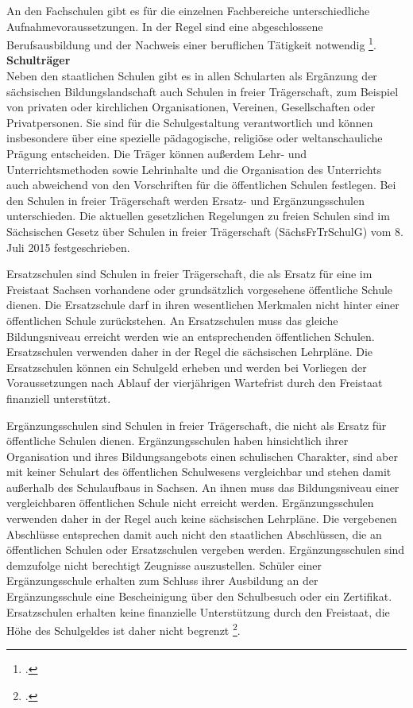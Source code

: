 An den Fachschulen gibt es für die einzelnen Fachbereiche unterschiedliche Aufnahmevoraussetzungen. In der Regel sind eine abgeschlossene Berufsausbildung und der Nachweis einer beruflichen Tätigkeit notwendig \footcite[vgl.][15ff]{SMKSK2013}.\\

\textbf{Schulträger}\\
Neben den staatlichen Schulen gibt es in allen Schularten als Ergänzung der sächsischen Bildungslandschaft auch Schulen in freier Trägerschaft, zum Beispiel von privaten oder kirchlichen Organisationen, Vereinen, Gesellschaften oder Privatpersonen. Sie sind für die Schulgestaltung verantwortlich und können insbesondere über eine spezielle pädagogische, religiöse oder weltanschauliche Prägung entscheiden. Die Träger können außerdem Lehr- und Unterrichtsmethoden sowie Lehrinhalte und die Organisation des Unterrichts auch abweichend von den Vorschriften für die öffentlichen Schulen festlegen. Bei den Schulen in freier Trägerschaft werden Ersatz- und Ergänzungsschulen unterschieden.  Die aktuellen gesetzlichen Regelungen zu freien Schulen sind im Sächsischen Gesetz über Schulen in freier Trägerschaft (SächsFrTrSchulG) vom 8. Juli 2015 festgeschrieben.

Ersatzschulen sind Schulen in freier Trägerschaft, die als Ersatz für eine im Freistaat Sachsen vorhandene oder grundsätzlich vorgesehene öffentliche Schule dienen. Die Ersatzschule darf in ihren wesentlichen Merkmalen nicht hinter einer öffentlichen Schule zurückstehen. An Ersatzschulen muss das gleiche Bildungsniveau erreicht werden wie an entsprechenden öffentlichen Schulen. Ersatzschulen verwenden daher in der Regel die sächsischen Lehrpläne. Die Ersatzschulen können ein Schulgeld erheben und werden bei Vorliegen der Voraussetzungen nach Ablauf der vierjährigen Wartefrist durch den Freistaat finanziell unterstützt. 

Ergänzungsschulen sind Schulen in freier Trägerschaft, die nicht als Ersatz für öffentliche Schulen dienen. Ergänzungsschulen haben hinsichtlich ihrer Organisation und ihres Bildungsangebots einen schulischen Charakter, sind aber mit keiner Schulart des öffentlichen Schulwesens vergleichbar und stehen damit außerhalb des Schulaufbaus in Sachsen. An ihnen muss das Bildungsniveau einer vergleichbaren öffentlichen Schule nicht erreicht werden. Ergänzungsschulen verwenden daher in der Regel auch keine sächsischen Lehrpläne. Die vergebenen Abschlüsse entsprechen damit auch nicht den staatlichen Abschlüssen, die an öffentlichen Schulen oder Ersatzschulen vergeben werden. Ergänzungsschulen sind demzufolge nicht berechtigt Zeugnisse auszustellen. Schüler einer Ergänzungsschule erhalten zum Schluss ihrer Ausbildung an der Ergänzungsschule eine Bescheinigung über den Schulbesuch oder ein Zertifikat. Ersatzschulen erhalten keine finanzielle Unterstützung durch den Freistaat, die Höhe des Schulgeldes ist daher nicht begrenzt \footcite[vgl.]{SMKSK2015a}. 


